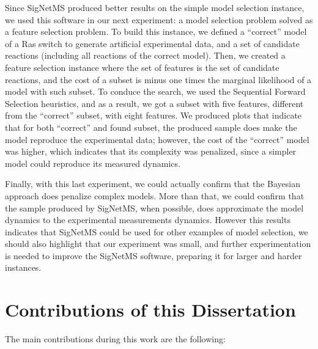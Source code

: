 Since SigNetMS produced better results on the simple model selection
instance, we used this software in our next experiment: a model
selection problem solved as a feature selection problem. To build this
instance, we defined a ``correct'' model of a Ras switch to generate
artificial experimental data, and a set of candidate reactions
(including all reactions of the correct model). Then, we created a
feature selection instance where the set of features is the set of
candidate reactions, and the cost of a subset is minus one times the
marginal likelihood of a model with such subset. To conduce the search,
we used the Sequential Forward Selection heuristics, and as a result, we
got a subset with five features, different from the ``correct'' subset,
with eight features. We produced plots that indicate that for both
``correct'' and found subset, the produced sample does make the model
reproduce the experimental data; however, the cost of the ``correct''
model was higher, which indicates that its complexity was penalized,
since a simpler model could reproduce its measured dynamics.

Finally, with this last experiment, we could actually confirm that the
Bayesian approach does penalize complex models. More than that, we could
confirm that the sample produced by SigNetMS, when possible, does
approximate the model dynamics to the experimental measurements
dynamics. However this results indicates that SigNetMS could be used for
other examples of model selection, we should also highlight that our
experiment was small, and further experimentation is needed to improve
the SigNetMS software, preparing it for larger and harder instances.

\section{Contributions of this Dissertation}
The main contributions during this work are the following:

